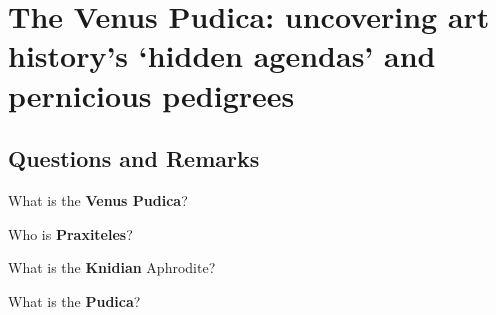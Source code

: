 %
%
%
\chapter{The Venus Pudica: uncovering art history's `hidden agendas' and pernicious pedigrees}
\label{venusPudica} %








\abstract{}

\section{Questions and Remarks}
\label{sec:QR8}

\begin{qst}
    What is the \textbf{Venus Pudica}?
\end{qst}

\begin{qst}
    Who is \textbf{Praxiteles}?
\end{qst}

\begin{qst}
    What is the \textbf{Knidian} Aphrodite?
\end{qst}


\begin{qst}
    What is the \textbf{Pudica}?
\end{qst}





